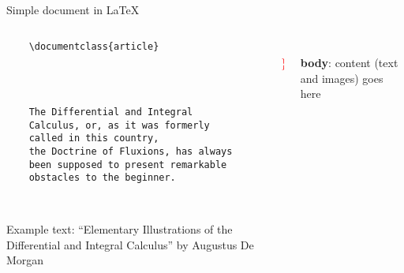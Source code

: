 \copyrightTim

\begin{frame}[fragile, t]{Simple document in \LaTeX}
	\begin{columns}[t]
        \begin{column}{0.5\textwidth}
			\vspace{-20pt}
	\begin{verbatim} 
	\documentclass{article}

		
	

	The Differential and Integral 
	Calculus, or, as it was formerly 
	called in this country, 
	the Doctrine of Fluxions, has always 
	been supposed to present remarkable 
	obstacles to the beginner.

	
	\end{verbatim}

	{\tiny
	Example text: ``Elementary Illustrations of the Differential and Integral Calculus''
	by Augustus De Morgan
	\par}
\end{column}
\begin{column}{0.05\textwidth}
	\vspace{0pt}

	\phantom{{\Huge \textcolor{red}{ \} } }}\\[1.5cm]
	{\Huge \textcolor{red}{ \} } }
\end{column}
\begin{column}{0.4\textwidth}
	\vspace{0pt}

	\leavevmode{} \phantom{here}\\[1.5cm]
	\textbf{body}: content (text and images) goes here
\end{column}
\end{columns}

\end{frame}
